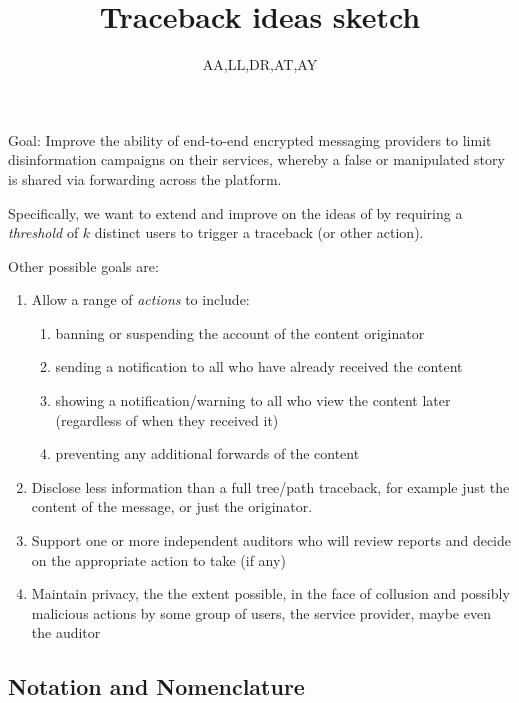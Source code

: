 \documentclass[letterpaper,12pt]{article}
\title{Traceback ideas sketch}
\author{AA,LL,DR,AT,AY}
\begin{document}
\maketitle

Goal: Improve the ability of end-to-end encrypted messaging providers to
limit disinformation campaigns on their services, whereby a false or
manipulated story is shared via forwarding across the platform.

Specifically, we want to extend and improve on the ideas of
\citep{TMR-traceback-ccs19} by requiring a \emph{threshold} of $k$
distinct users to trigger a traceback (or other action).

Other possible goals are:
\begin{enumerate}
  \item Allow a range of \emph{actions} to include:
  \begin{enumerate}
    \item banning or suspending the account of the content originator
    \item sending a notification to all who have already received the
    content
    \item showing a notification/warning to all who view the content
    later (regardless of when they received it)
    \item preventing any additional forwards of the content
  \end{enumerate}
  \item Disclose less information than a full tree/path traceback, for
  example just the content of the message, or just the originator.
  \item Support one or more independent auditors who will review reports
  and decide on the appropriate action to take (if any)
  \item Maintain privacy, the the extent possible, in the face of
  collusion and possibly malicious actions by some group of users, the
  service provider, maybe even the auditor
\end{enumerate}

\subsection{Notation and Nomenclature}
\end{document}
